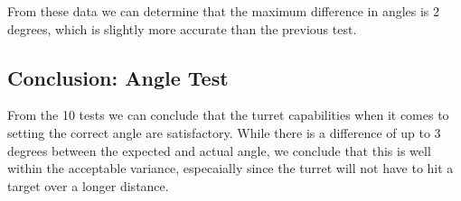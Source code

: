 
From these data we can determine that the maximum difference in angles is 2
degrees, which is slightly more accurate than the previous test.

\subsection{Conclusion: Angle Test}
From the 10 tests we can conclude that the turret capabilities when it comes to
setting the correct angle are satisfactory. While there is a difference of up to
3 degrees between the expected and actual angle, we conclude that this is well
within the acceptable variance, especaially since the turret will not have to
hit a target over a longer distance.   